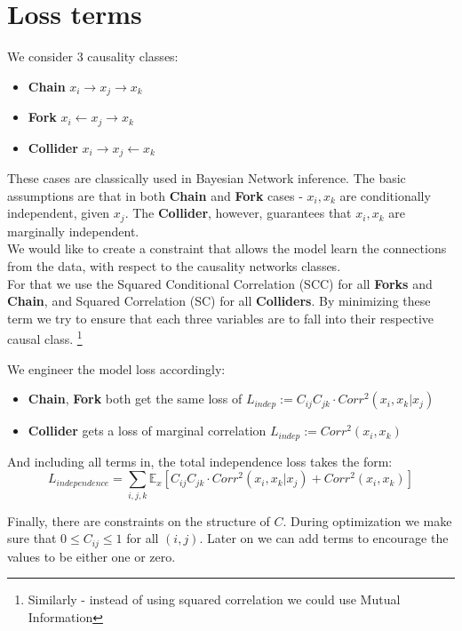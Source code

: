 \documentclass{article}
\newcommand{\EE}{\mathbb{E}}
\begin{document}
\section{Loss terms}
We consider 3 causality classes:
\begin{itemize}
    \item \textbf{Chain} $x_i \to x_j \to x_k$
    \item \textbf{Fork} $x_i \leftarrow x_j \rightarrow x_k$
    \item \textbf{Collider} $x_i \rightarrow x_j \leftarrow x_k$
\end{itemize}
These cases are classically used in Bayesian Network inference. The basic assumptions are that in both \textbf{Chain} and \textbf{Fork} cases - $x_i, x_k$ are conditionally independent, given $x_j$. The \textbf{Collider}, however, guarantees that $x_i, x_k$ are marginally independent. \\
We would like to create a constraint that allows the model learn the connections from the data, with respect to the causality networks classes. \\
For that we use the Squared Conditional Correlation (SCC) for all \textbf{Forks} and \textbf{Chain}, and Squared Correlation (SC) for all \textbf{Colliders}. By minimizing these term we try to ensure that each three variables are to fall into their respective causal class. \footnote{Similarly - instead of using squared correlation we could use Mutual Information} \par
We engineer the model loss accordingly:
\begin{itemize}
	\item \textbf{Chain}, \textbf{Fork} both get the same loss of 
	$L_{indep} := C_{ij}C_{jk} \cdot Corr^2(x_i, x_k | x_j)$ 
	\item \textbf{Collider} gets a loss of marginal correlation 
	$L_{indep} := Corr^2(x_i, x_k)$ 
\end{itemize}
And including all terms in, the total independence loss takes the form:
\begin{equation}
	L_{independence} = \sum_{i, j, k} \EE_x \left[C_{ij}C_{jk} \cdot Corr^2(x_i, x_k | x_j) + Corr^2(x_i, x_k)\right]
\end{equation}
\par

Finally, there are constraints on the structure of $C$.
During optimization we make sure that $0 \leq C_{ij} \leq 1$ for all $(i,j)$.
Later on we can add terms to encourage the values to be either one or zero.
\end{document}
